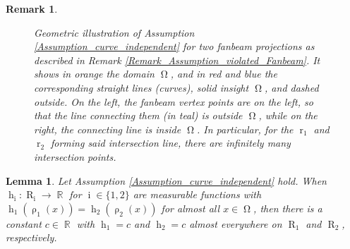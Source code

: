 \documentclass[12pt]{article}
\newtheorem{lemma}[theorem]{Lemma}
\newtheorem{remark}[theorem]{Remark}
\DeclareMathOperator{\projvariable}{i}
\DeclareMathOperator{\RR}{{\mathbb{R}}}
\DeclareMathOperator{\rayvariable}{r}
\DeclareMathOperator{\raygroundset}{R}
\DeclareMathOperator{\rayinverse}{\rho}
\DeclareMathOperator{\stripfkt}{h}
\DeclareMathOperator{\imgdom}{{\Omega}}
\begin{document}
\begin{remark}
\begin{figure}
\caption{Geometric illustration of Assumption \ref{Assumption_curve_independent} for two fanbeam projections as described in Remark \ref{Remark_Assumption_violated_Fanbeam}. It shows in orange the domain $\imgdom$, and in red and blue the corresponding straight lines (curves), solid insight $\imgdom$, and dashed outside. On the left, the fanbeam vertex points are on the left, so that the line connecting  them (in teal) is outside $\imgdom$, while on the right, the connecting line is inside $\imgdom$. In particular, for the $\rayvariable_1$ and $\rayvariable_2$ forming said intersection line, there are infinitely many intersection points.}
\label{fig_number_of_intersections}
\end{figure}
\end{remark}





\begin{lemma}
\label{lemma_connected_separation}
Let Assumption \ref{Assumption_curve_independent}  hold. When $\stripfkt_{\projvariable}\colon \raygroundset_{\projvariable} \to \RR$ for $\projvariable\in \{1,2\}$ are measurable functions with $\stripfkt_1(\rayinverse_1(x))=\stripfkt_2( \rayinverse_2(x))$ for almost all $x\in \imgdom$, then there is a constant $c\in \RR$ with $\stripfkt_1=c$  and $\stripfkt_2=c$ almost everywhere on $\raygroundset_1$ and $\raygroundset_2$, respectively.
\end{lemma}
\end{document}
